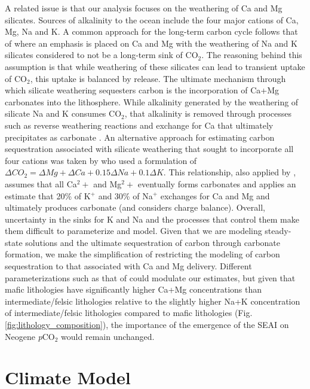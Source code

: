 \documentclass[11pt,letterpaper]{article}
\newcommand{\pCOtwo}{\textit{p}CO$_{2}$\xspace}
\newcommand{\COtwo}{CO$_{2}$\xspace}
\begin{document}
A related issue is that our analysis focuses on the weathering of Ca and Mg silicates. Sources of alkalinity to the ocean include the four major cations of Ca, Mg, Na and K. A common approach for the long-term carbon cycle follows that of \citet{Berner1984a} where an emphasis is placed on Ca and Mg with the weathering of Na and K silicates considered to not be a long-term sink of \COtwo. The reasoning behind this assumption is that while weathering of these silicates can lead to transient uptake of \COtwo, this uptake is balanced by release. The ultimate mechanism through which silicate weathering sequesters carbon is the incorporation of Ca+Mg carbonates into the lithosphere. While alkalinity generated by the weathering of silicate Na and K consumes \COtwo, that alkalinity is removed through processes such as reverse weathering reactions and exchange for Ca that ultimately precipitates as carbonate \cite{Sun2016a}. An alternative approach for estimating carbon sequestration associated with silicate weathering that sought to incorporate all four cations was taken by \citet{France-Lanord1997a} who used a formulation of $\Delta CO_2 = \Delta Mg + \Delta Ca + 0.15 \Delta Na + 0.1 \Delta K$. This relationship, also applied by \citet{Schopka2011a}, assumes that all Ca$^2+$ and Mg$^2+$ eventually forms carbonates and applies an estimate that 20\% of K$^+$ and 30\% of Na$^+$ exchanges for Ca and Mg and ultimately produces carbonate (and considers charge balance). Overall, uncertainty in the sinks for K and Na and the processes that control them make them difficult to parameterize and model. Given that we are modeling steady-state solutions and the ultimate sequestration of carbon through carbonate formation, we make the simplification of restricting the modeling of carbon sequestration to that associated with Ca and Mg delivery. Different parameterizations such as that of \citet{France-Lanord1997a} could modulate our estimates, but given that mafic lithologies have significantly higher Ca+Mg concentrations than intermediate/felsic lithologies relative to the slightly higher Na+K concentration of intermediate/felsic lithologies compared to mafic lithologies (Fig. \ref{fig:lithology_composition}), the importance of the emergence of the SEAI on Neogene \pCOtwo would remain unchanged.

\section*{Climate Model}
\end{document}
